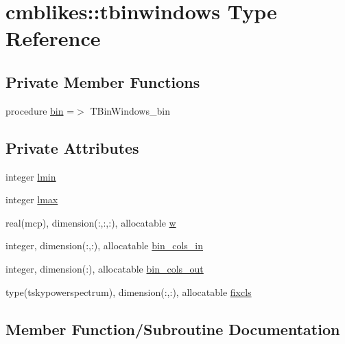 \hypertarget{structcmblikes_1_1tbinwindows}{}\section{cmblikes\+:\+:tbinwindows Type Reference}
\label{structcmblikes_1_1tbinwindows}
\subsection*{Private Member Functions}
\begin{DoxyCompactItemize}
\item 
procedure \mbox{\hyperlink{structcmblikes_1_1tbinwindows_a01baf2ecb4e9629d0256ace94ceb1430}{bin}} =$>$ T\+Bin\+Windows\+\_\+bin
\end{DoxyCompactItemize}
\subsection*{Private Attributes}
\begin{DoxyCompactItemize}
\item 
integer \mbox{\hyperlink{structcmblikes_1_1tbinwindows_a2c4fb8bbfaf978ed6a869b9246528c7e}{lmin}}
\item 
integer \mbox{\hyperlink{structcmblikes_1_1tbinwindows_ae5127896c2e731a2c0a0462f37f46eff}{lmax}}
\item 
real(mcp), dimension(\+:,\+:,\+:), allocatable \mbox{\hyperlink{structcmblikes_1_1tbinwindows_a673f7873fea6e9964f3c41c0a051edd2}{w}}
\item 
integer, dimension(\+:,\+:), allocatable \mbox{\hyperlink{structcmblikes_1_1tbinwindows_a046820b590f74c78ad85ec4d3f9dc0f0}{bin\+\_\+cols\+\_\+in}}
\item 
integer, dimension(\+:), allocatable \mbox{\hyperlink{structcmblikes_1_1tbinwindows_a3fa262b886063621f190d56e2d8fe635}{bin\+\_\+cols\+\_\+out}}
\item 
type(tskypowerspectrum), dimension(\+:,\+:), allocatable \mbox{\hyperlink{structcmblikes_1_1tbinwindows_a119b40568f84928569114991d177e7b4}{fixcls}}
\end{DoxyCompactItemize}


\subsection{Member Function/\+Subroutine Documentation}
\mbox{\label{structcmblikes_1_1tbinwindows_a01baf2ecb4e9629d0256ace94ceb1430}} 
